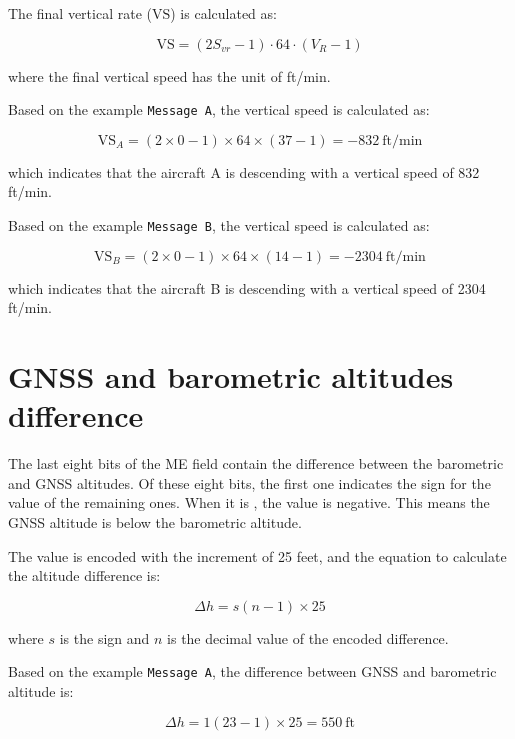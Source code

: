 The final vertical rate ($\mathrm{VS}$) is calculated as:

\begin{equation}
  \mathrm{VS} = (2S_{vr} - 1) \cdot 64 \cdot (V_R - 1)
\end{equation}

where the final vertical speed has the unit of ft/min.

Based on the example \texttt{Message A}, the vertical speed is calculated as:

\begin{equation}
  \mathrm{VS}_A = (2 \times 0 - 1) \times 64 \times (37 -1) = -832 ~\text{ft/min}
\end{equation}

which indicates that the aircraft A is descending with a vertical speed of 832 ft/min.

Based on the example \texttt{Message B}, the vertical speed is calculated as:

\begin{equation}
  \mathrm{VS}_B = (2 \times 0 - 1) \times 64 \times (14 -1) = -2304 ~\text{ft/min}
\end{equation}

which indicates that the aircraft B is descending with a vertical speed of 2304 ft/min.


\section{GNSS and barometric altitudes difference}

The last eight bits of the ME field contain the difference between the barometric and GNSS altitudes. Of these eight bits, the first one indicates the sign for the value of the remaining ones. When it is \1, the value is negative. This means the GNSS altitude is below the barometric altitude.

The value is encoded with the increment of 25 feet, and the equation to calculate the altitude difference is:

\begin{equation}
  \Delta h = s (n - 1) \times 25
\end{equation}

where $s$ is the sign and $n$ is the decimal value of the encoded difference.

Based on the example \texttt{Message A}, the difference between GNSS and barometric altitude is:

\begin{equation}
  \Delta h = 1 (23 - 1) \times 25 = 550 ~\text{ft}
\end{equation}

